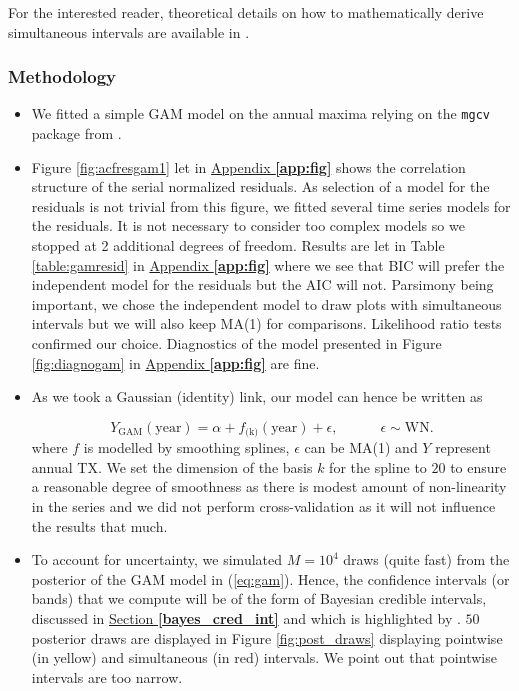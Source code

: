 For the interested reader, theoretical details on how to mathematically derive simultaneous intervals are available in \citet[pp.142-144]{ruppert_semiparametric_2003}.


\subsubsection*{Methodology}

\begin{itemize}
\item We fitted a simple GAM model on the annual maxima relying on the \texttt{mgcv} package from \citet{maindonald_data_2006}.

\item  Figure \ref{fig:acfresgam1} let in \hyperref[app:fig]{Appendix \textbf{\ref{app:fig}}} shows the correlation structure of the serial normalized residuals. As selection of a model for the residuals is not trivial from this figure, we fitted several time series models for the residuals. It is not necessary to consider too complex models so we stopped at 2 additional degrees of freedom. Results are let in Table \ref{table:gamresid} in \hyperref[app:fig]{Appendix \textbf{\ref{app:fig}}} where we see that BIC will prefer the independent model for the residuals but the AIC will not. Parsimony being important, we chose the independent model to draw plots with simultaneous intervals but we will also keep MA(1) for comparisons. Likelihood ratio tests confirmed our choice. Diagnostics of the model presented in Figure \ref{fig:diagnogam} in \hyperref[app:fig]{Appendix \textbf{\ref{app:fig}}} are fine.

\item As we took a Gaussian (identity) link, our model can hence be written as

\begin{equation}\label{eq:gam}
Y_{\text{GAM}}(\text{year}) = \alpha + f_{\text{(k)}}(\text{year})+\epsilon , \qquad\quad \epsilon\sim\text{WN}.
\end{equation}
where $f$ is modelled by smoothing splines, $\epsilon$ can be MA(1) and $Y$ represent annual TX. We set the dimension of the basis $k$ for the spline to $20$ to ensure a reasonable degree of smoothness as there is modest amount of non-linearity in the series and we did not perform cross-validation as it will not influence the results that much. 

\item  To account for uncertainty, we simulated $M = 10^4$ draws (quite fast) from the posterior of the GAM model in (\ref{eq:gam}). Hence, the confidence intervals (or bands) that we compute will be of the form of Bayesian credible intervals,  discussed in \hyperref[bayes_cred_int]{Section \textbf{\ref{bayes_cred_int}}} and which is highlighted by \citet{marra_coverage_2012}.
$50$ posterior draws are displayed in Figure \ref{fig:post_draws} %
 displaying pointwise (in yellow) and simultaneous (in red) intervals. We point out that pointwise intervals are too narrow.
\end{itemize}

